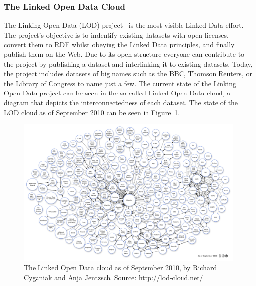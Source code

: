 \documentclass[12pt]{article}
\begin{document}
\subsubsection{The Linked Open Data Cloud}\label{sec:lodcloud}
The Linking Open Data (LOD) project~\cite{lodproject} is the most visible Linked Data effort. The project's objective is to indentify existing datasets with open licenses, convert them to RDF whilst obeying the Linked Data principles, and finally publish them on the Web. Due to its open structure everyone can contribute to the project by publishing a dataset and interlinking it to existing datasets. Today, the project includes datasets of big names such as the BBC, Thomson Reuters, or the Library of Congress to name just a few. The current state of the Linking Open Data project can be seen in the so-called Linked Open Data cloud, a diagram that depicts the interconnectedness of each dataset. The state of the LOD cloud as of September 2010 can be seen in Figure~\ref{fig:lod-cloud}.
\begin{figure}[htbp!]
\begin{center}
    \includegraphics[width=1.0\textwidth]{./resources/lod-cloud.png}    
  \caption[The Linked Open Data cloud as of September 2010.]{The Linked Open Data cloud as of September 2010, by Richard Cyganiak and Anja Jentzsch. Source: \url{http://lod-cloud.net/}}    
  \label{fig:lod-cloud}
  \end{center}  
\end{figure}
\end{document}
